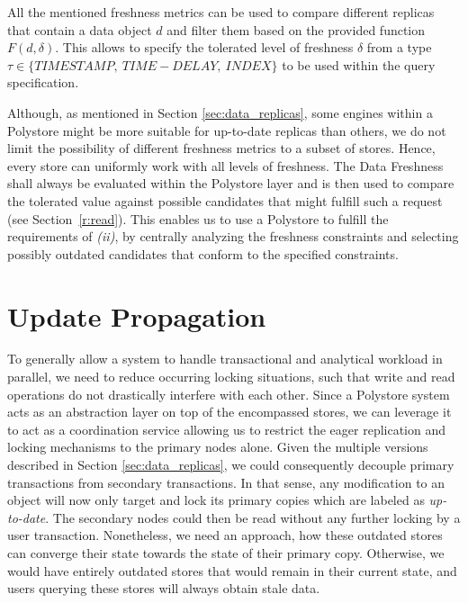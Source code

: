 All the mentioned freshness metrics can be used to compare different replicas that contain a data object $d$ and filter them based on the provided function $F(d, \delta)$.
This allows to specify the tolerated level of freshness $\delta$ from a type $\tau \in \{TIMESTAMP, \:TIME-DELAY, \:INDEX\}$ to be used within the query specification.

Although, as mentioned in Section \ref{sec:data_replicas}, some engines within a Polystore might be more suitable for up-to-date replicas than others,
we do not limit the possibility of different freshness metrics to a subset of stores. Hence, every store can uniformly work with all levels of freshness.
The Data Freshness shall always be evaluated within the Polystore layer and is then used to compare the tolerated value against possible candidates that might fulfill such a request 
(see Section~\ref{r:read}). This enables us to use a Polystore to fulfill the requirements of \textit{(ii)}, by centrally analyzing the freshness constraints and selecting possibly outdated 
candidates that conform to the specified constraints.







\section{Update Propagation}
\label{sec:propagation}

To generally allow a system to handle transactional and analytical workload in parallel, we need to reduce occurring locking situations,
such that write and read operations do not drastically interfere with each other.
Since a Polystore system acts as an abstraction layer on top of the encompassed stores, we can leverage it to act as a coordination service 
allowing us to restrict the eager replication and locking mechanisms to the primary nodes alone.
Given the multiple versions described in Section \ref{sec:data_replicas}, we could consequently decouple primary transactions from 
secondary transactions. In that sense, any modification to an object will now only target and lock its primary copies which are labeled as \emph{up-to-date}.
The secondary nodes could then be read without any further locking by a user transaction. 
Nonetheless, we need an approach, how these outdated stores can converge their state towards the state of their primary copy.
Otherwise, we would have entirely outdated stores that would remain in their current state, and users querying these stores will always obtain stale data. 


